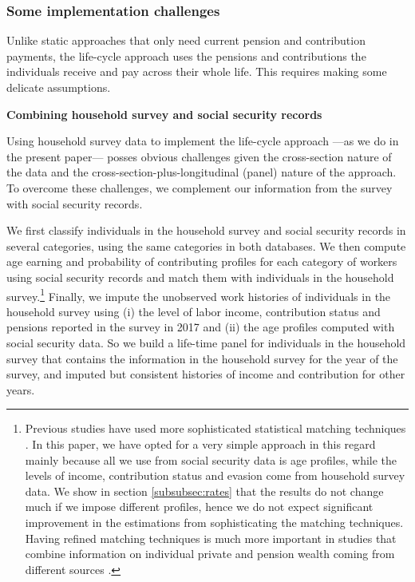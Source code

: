\documentclass{article}
\begin{document}
\subsubsection{Some implementation challenges}

Unlike static approaches that only need current pension and contribution payments, the life-cycle approach uses the pensions and contributions the individuals receive and pay across their whole life. This requires making some delicate assumptions.


\textbf{Combining household survey and social security records}

Using household survey data to implement the life-cycle approach ---as we do in the present paper--- posses obvious challenges given the cross-section nature of the data and the cross-section-plus-longitudinal (panel) nature of the approach. To overcome these challenges, we complement our information from the survey with social security records. 

We first classify individuals in the household survey and social security records in several categories, using the same categories in both databases. We then compute age earning and probability of contributing profiles for each category of workers using social security records and match them with individuals in the household survey.\footnote{Previous studies have used more sophisticated statistical matching techniques \parencite{Frick2013, Frick2010, Engelhardt2011, Wolff2007, Alessie2013}. In this paper, we have opted for a very simple approach in this regard mainly because all we use from social security data is age profiles, while the levels of income, contribution status and evasion come from household survey data. We show in section \ref{subsubsec:rates} that the results do not change much if we impose different profiles, hence we do not expect significant improvement in the estimations from sophisticating the matching techniques. Having refined matching techniques is much more important in studies that combine information on individual private and pension wealth coming from different sources \parencite[see, for example,][]{Frick2010}.} Finally, we impute the unobserved work histories of individuals in the household survey using (i) the level of labor income, contribution status and pensions reported in the survey in 2017 and (ii) the age profiles computed with social security data. So we build a life-time panel for individuals in the household survey that contains the information in the household survey for the year of the survey, and imputed but consistent histories of income and contribution for other years. 
\end{document}
